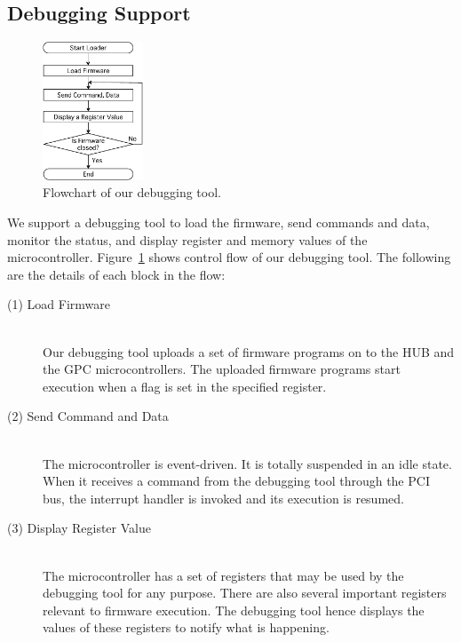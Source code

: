 \subsection{Debugging Support}

\begin{figure}[!t]
 \begin{center}
  \includegraphics[width=3cm]{./img/loader.pdf}
 \end{center}
 \caption{Flowchart of our debugging tool.}
 \label{fig:loader}
\end{figure}

We support a debugging tool to load the firmware, send commands and
data, monitor the status, and display register and memory values of the
microcontroller.
Figure~\ref{fig:loader} shows control flow of our debugging tool.
The following are the details of each block in the flow:

\begin{description}
 \item[(1) Load Firmware]\mbox{}\\
	   Our debugging tool uploads a set of firmware programs on to
	   the HUB and the GPC microcontrollers.
	   The uploaded firmware programs start execution when a flag is
	   set in the specified register.
 \item[(2) Send Command and Data]\mbox{}\\
	    The microcontroller is event-driven.
	    It is totally suspended in an idle state.
	    When it receives a command from the debugging tool through
	    the PCI bus, the interrupt handler is invoked and its
	    execution is resumed.
\item[(3) Display Register Value] \mbox{}\\
	   The microcontroller has a set of registers that may be used
	   by the debugging tool for any purpose.
	   There are also several important registers relevant to
	   firmware execution.
	   The debugging tool hence displays the values of these
	   registers to notify what is happening.
\end{description}

